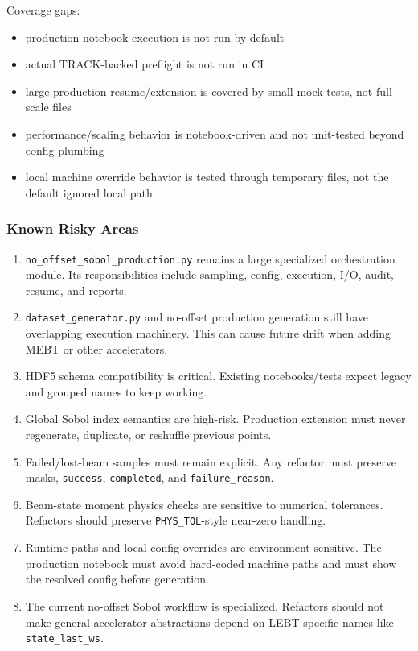 \documentclass[
]{article}
\providecommand{\tightlist}{%
  \setlength{\itemsep}{0pt}\setlength{\parskip}{0pt}}
\begin{document}
Coverage gaps:

\begin{itemize}
\tightlist
\item
  production notebook execution is not run by default
\item
  actual TRACK-backed preflight is not run in CI
\item
  large production resume/extension is covered by small mock tests, not
  full-scale files
\item
  performance/scaling behavior is notebook-driven and not unit-tested
  beyond config plumbing
\item
  local machine override behavior is tested through temporary files, not
  the default ignored local path
\end{itemize}

\hypertarget{known-risky-areas}{%
\subsubsection{Known Risky Areas}\label{known-risky-areas}}

\begin{enumerate}
\def\labelenumi{\arabic{enumi}.}
\item
  \texttt{no\_offset\_sobol\_production.py} remains a large specialized
  orchestration module. Its responsibilities include sampling, config,
  execution, I/O, audit, resume, and reports.
\item
  \texttt{dataset\_generator.py} and no-offset production generation
  still have overlapping execution machinery. This can cause future
  drift when adding MEBT or other accelerators.
\item
  HDF5 schema compatibility is critical. Existing notebooks/tests expect
  legacy and grouped names to keep working.
\item
  Global Sobol index semantics are high-risk. Production extension must
  never regenerate, duplicate, or reshuffle previous points.
\item
  Failed/lost-beam samples must remain explicit. Any refactor must
  preserve masks, \texttt{success}, \texttt{completed}, and
  \texttt{failure\_reason}.
\item
  Beam-state moment physics checks are sensitive to numerical
  tolerances. Refactors should preserve \texttt{PHYS\_TOL}-style
  near-zero handling.
\item
  Runtime paths and local config overrides are environment-sensitive.
  The production notebook must avoid hard-coded machine paths and must
  show the resolved config before generation.
\item
  The current no-offset Sobol workflow is specialized. Refactors should
  not make general accelerator abstractions depend on LEBT-specific
  names like \texttt{state\_last\_ws}.
\end{enumerate}
\end{document}
